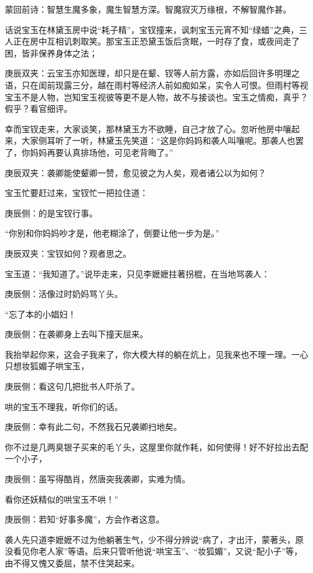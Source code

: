 
\begin{parag}
    \begin{note}蒙回前诗：智慧生魔多象，魔生智慧方深。智魔寂灭万缘根，不解智魔作甚。\end{note}
\end{parag}


\begin{parag}
    话说宝玉在林黛玉房中说“耗子精”，宝钗撞来，讽刺宝玉元宵不知“绿蜡”之典，三人正在房中互相讥刺取笑。那宝玉正恐黛玉饭后贪眠，一时存了食，或夜间走了困，皆非保养身体之法；\begin{note}庚辰双夹：云宝玉亦知医理，却只是在颦、钗等人前方露，亦如后回许多明理之语，只在闺前现露三分，越在雨村等经济人前如痴如呆，实令人可恨。但雨村等视宝玉不是人物，岂知宝玉视彼等更不是人物，故不与接谈也。宝玉之情痴，真乎？假乎？看官细评。\end{note}幸而宝钗走来，大家谈笑，那林黛玉方不欲睡，自己才放了心。忽听他房中嚷起来，大家侧耳听了一听，林黛玉先笑道：“这是你妈妈和袭人叫嚷呢。那袭人也罢了，你妈妈再要认真排场他，可见老背晦了。”\begin{note}庚辰双夹：袭卿能使颦卿一赞，愈见彼之为人矣，观者诸公以为如何？\end{note}
\end{parag}


\begin{parag}
    宝玉忙要赶过来，宝钗忙一把拉住道：\begin{note}庚辰侧：的是宝钗行事。\end{note}“你别和你妈妈吵才是，他老糊涂了，倒要让他一步为是。”\begin{note}庚辰双夹：宝钗如何？观者思之。\end{note}宝玉道：“我知道了。”说毕走来，只见李嬷嬷拄著拐棍，在当地骂袭人：\begin{note}庚辰侧：活像过时奶妈骂丫头。\end{note}“忘了本的小娼妇！\begin{note}庚辰侧：在袭卿身上去叫下撞天屈来。\end{note}我抬举起你来，这会子我来了，你大模大样的躺在炕上，见我来也不理一理。一心只想妆狐媚子哄宝玉，\begin{note}庚辰侧：看这句几把批书人吓杀了。\end{note}哄的宝玉不理我，听你们的话。\begin{note}庚辰侧：幸有此二句，不然我石兄袭卿扫地矣。\end{note}你不过是几两臭银子买来的毛丫头，这屋里你就作耗，如何使得！好不好拉出去配一个小子，\begin{note}庚辰侧：虽写得酷肖，然唐突我袭卿，实难为情。\end{note}看你还妖精似的哄宝玉不哄！”\begin{note}庚辰侧：若知“好事多魔”，方会作者这意。\end{note}袭人先只道李嬷嬷不过为他躺著生气，少不得分辨说“病了，才出汗，蒙著头，原没看见你老人家”等语。后来只管听他说“哄宝玉”、“妆狐媚”，又说“配小子”等，由不得又愧又委屈，禁不住哭起来。
\end{parag}


